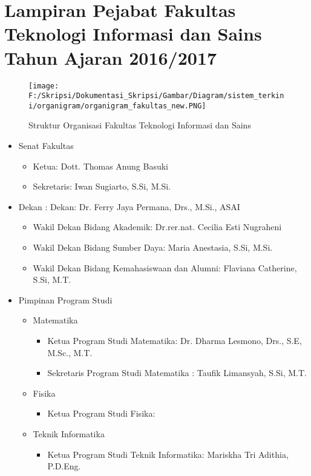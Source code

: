 \chapter{Lampiran Pejabat Fakultas Teknologi Informasi dan Sains Tahun Ajaran 2016/2017}
\label{lamp:H}

\begin{figure}[H]
	\centering
		\texttt{[image: F:/Skripsi/Dokumentasi\_Skripsi/Gambar/Diagram/sistem\_terkini/organigram/organigram\_fakultas\_new.PNG]}
	\caption{Struktur Organisasi Fakultas Teknologi Informasi dan Sains}
	\label{fig:lampiran_organigram_fakultas}
\end{figure}
\begin{itemize}
	\item Senat Fakultas
	\begin{itemize}
		\item Ketua: Dott. Thomas Anung Basuki
		\item Sekretaris: Iwan Sugiarto, S.Si, M.Si.
	\end{itemize}
	\item Dekan : Dekan: Dr. Ferry Jaya Permana, Drs., M.Si., ASAI
	\begin{itemize}
		\item Wakil Dekan Bidang Akademik: Dr.rer.nat. Cecilia Esti Nugraheni
		\item Wakil Dekan Bidang Sumber Daya: Maria Anestasia, S.Si, M.Si.
		\item Wakil Dekan Bidang Kemahasiswaan dan Alumni: Flaviana Catherine, S.Si, M.T.
	\end{itemize}
	\item Pimpinan Program Studi
	\begin{itemize}
		\item Matematika
		\begin{itemize}
			\item Ketua Program Studi Matematika: Dr. Dharma Lesmono, Drs., S.E, M.Sc., M.T.
			\item Sekretaris Program Studi Matematika : Taufik Limansyah, S.Si, M.T.
		\end{itemize}
		\item Fisika
		\begin{itemize}
			\item Ketua Program Studi Fisika: 
		\end{itemize}
		\item Teknik Informatika
		\begin{itemize}
			\item Ketua Program Studi Teknik Informatika: Mariskha Tri Adithia, P.D.Eng.

\end{itemize}
\end{itemize}
\end{itemize}
